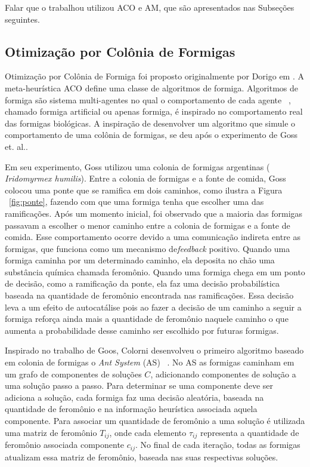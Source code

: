 Falar que o trabalhou utilizou ACO e AM, que são apresentados nas
Subseções seguintes.

\subsection{Otimização por Colônia de Formigas}

Otimização por Colônia de Formiga foi proposto originalmente por Dorigo em
\cite{aco-origin}. A meta-heurística ACO define uma classe de algoritmos
de formiga. Algoritmos de formiga são sistema multi-agentes no qual o
comportamento de cada agente ~\cite{aco-origin2}, chamado formiga artificial
ou apenas formiga, é inspirado no comportamento real das formigas biológicas.
A inspiração de desenvolver um algoritmo que simule o comportamento de uma
colônia de formigas, se deu após o experimento de Goss et. al.\cite{Goss}.

Em seu experimento, Goss utilizou uma colonia de formigas argentinas ({\it
Iridomyrmex humilis}). Entre a colonia de formigas e a fonte de comida, Goss
colocou uma ponte que se ramifica em dois caminhos, como ilustra a Figura
~\ref{fig:ponte}, fazendo com que uma formiga tenha que escolher uma das
ramificações. Após um momento inicial, foi observado que a maioria das
formigas passavam a escolher o menor caminho entre a colonia de formigas
e a fonte de comida. Esse comportamento ocorre devido a uma comunicação
indireta entre as formigas, que funciona como um mecanismo de{\it feedback}
positivo. Quando uma formiga caminha por um determinado caminho, ela deposita
no chão uma substância química chamada feromônio. Quando uma formiga
chega em um ponto de decisão, como a ramificação da ponte, ela faz uma
decisão probabilística baseada na quantidade de feromônio encontrada
nas ramificações. Essa decisão leva a um efeito de autocatálise pois
ao fazer a decisão de um caminho a seguir a formiga reforça ainda mais a
quantidade de feromônio naquele caminho o que aumenta a probabilidade desse
caminho ser escolhido por futuras formigas.

Inspirado no trabalho de Goos, Colorni desenvolveu o primeiro algoritmo
baseado em colonia de formigas o {\it Ant System} (AS) ~\cite{as-origin}.
No AS as formigas caminham em um grafo de componentes de soluções $C$,
adicionando componentes de solução a uma solução passo a passo. Para
determinar se uma componente deve ser adiciona a solução, cada formiga
faz uma decisão aleatória, baseada na quantidade de feromônio e
na informação heurística associada aquela componente. Para associar um
quantidade de feromônio a uma solução é utilizada uma matriz de feromônio
$T_{ij}$, onde cada elemento $\tau_{ij}$ representa a quantidade de feromônio
associada componente $c_{ij}$. No final de cada iteração, todas as formigas
atualizam essa matriz de feromônio, baseada nas suas respectivas soluções.

